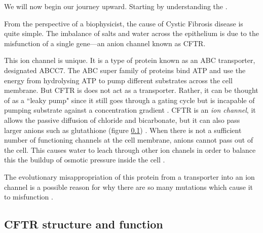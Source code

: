 We will now begin our journey upward. Starting by understanding the .

From the perspective of a biophysicist, the cause of Cystic Fibrosis disease is quite simple. The imbalance of salts and water across the epithelium is due to the misfunction of a single gene---an anion channel known as CFTR.

This ion channel is unique. It is a type of protein known as an ABC transporter, designated ABCC7. The ABC super family of proteins bind ATP and use the energy from hydrolysing ATP to pump different substrates across the cell membrane. But CFTR is does not act as a transporter. Rather, it can be thought of as a ``leaky pump" since it still goes through a gating cycle but is incapable of pumping substrate against a concentration gradient \cite{gadsby2006,linsdell2018}. CFTR is an \textit {ion channel}, it allows the passive diffusion of chloride and bicarbonate, but it can also pass larger anions such as glutathione (figure \ref{}) \cite{gadsby2006, tang2009,linsdell1998}. When there is not a sufficient number of functioning channels at the cell membrane, anions cannot pass out of the cell. This causes water to leach through other ion chanels in order to balance this the buildup of osmotic pressure inside the cell \cite{verkman2003}. 

The evolutionary misappropriation of this protein from a transporter into an ion channel is a possible reason for why there are so many mutations which cause it to misfunction \cite{infield2021}.

\subsection{CFTR structure and function}


